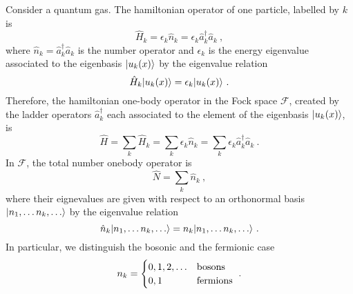     Consider a quantum gas. The hamiltonian operator of one particle, labelled by $k$ is 
    \begin{equation*}
        \hat H_k = \epsilon_k \hat n_k = \epsilon_k \hat a^\dagger_k \hat a_k ~,
    \end{equation*}
    where $\hat n_k = \hat a^\dagger_k \hat a_k$ is the number operator and $\epsilon_k$ is the energy eigenvalue associated to the eigenbasis $\vert u_k(x)\rangle$ by the eigenvalue relation
    \begin{equation*}
        \hat H_k \vert u_k(x)\rangle = \epsilon_k \vert u_k(x)\rangle ~.
    \end{equation*} 
    Therefore, the hamiltonian one-body operator in the Fock space $\mathcal F$, created by the ladder operators $\hat a^\dagger_k$ each associated to the element of the eigenbasis $\vert u_k(x)\rangle$, is 
    \begin{equation*}
        \hat H = \sum_k \hat H_k =  \sum_k \epsilon_k \hat n_k =  \sum_k \epsilon_k \hat a^\dagger_k \hat a_k ~.
    \end{equation*}
    In $\mathcal F$, the total number onebody operator is 
    \begin{equation*}
        \hat N = \sum_k \hat n_k ~,
    \end{equation*}
    where their eignevalues are given with respect to an orthonormal basis $\vert n_1, \ldots n_k, \ldots\rangle$ by the eigenvalue relation
    \begin{equation*}
        \hat n_k \vert n_1, \ldots n_k, \ldots\rangle = n_k \vert n_1, \ldots n_k, \ldots\rangle ~.
    \end{equation*}
    In particular, we distinguish the bosonic and the fermionic case
    \begin{equation*}
        n_k = \begin{cases}
            0,1,2,\ldots & \textnormal{bosons} \\
            0,1 & \textnormal{fermions} \\
        \end{cases} ~.
    \end{equation*}

